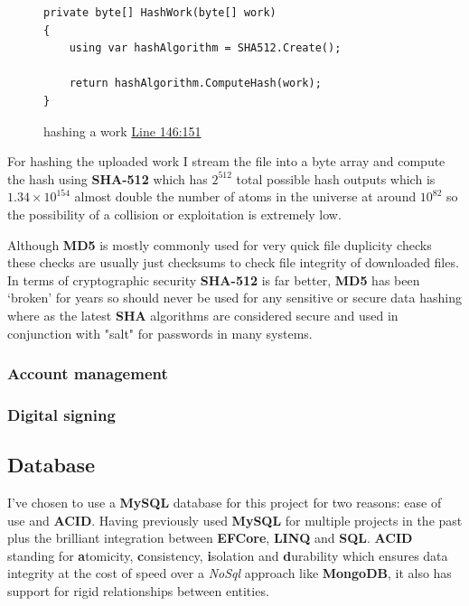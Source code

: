 \begin{figure}[H]
\caption{hashing a work \href{https://github.com/MrHarrisonBarker/CRPL/blob/main/CRPL.Web/Services/WorksVerificationService.cs}{Line 146:151}}
\centering
\begin{lstlisting}[language=CSharp]
private byte[] HashWork(byte[] work)
{
	using var hashAlgorithm = SHA512.Create();

	return hashAlgorithm.ComputeHash(work);
}
\end{lstlisting}
\end{figure}

For hashing the uploaded work I stream the file into a byte array and compute the hash using \textbf{SHA-512} which has \(2^{512}\) total possible hash outputs which is \(1.34 \times 10^{154}\) almost double the number of atoms in the universe at around \(10^{82}\) so the possibility of a collision or exploitation is extremely low. 

Although \textbf{MD5} is mostly commonly used for very quick file duplicity checks these checks are usually just checksums to check file integrity of downloaded files. In terms of cryptographic security \textbf{SHA-512} is far better, \textbf{MD5} has been `broken' for years so should never be used for any sensitive or secure data hashing where as the latest \textbf{SHA} algorithms are considered secure and used in conjunction with "salt" for passwords in many systems.

\subsubsection{Account management}
\subsubsection{Digital signing}

\subsection{Database}

I've chosen to use a \textbf{MySQL} database for this project for two reasons: ease of use and \textbf{ACID}. Having previously used \textbf{MySQL} for multiple projects in the past plus the brilliant integration between \textbf{EFCore}, \textbf{LINQ} and \textbf{SQL}. \textbf{ACID} standing for \textbf{a}tomicity, \textbf{c}onsistency, \textbf{i}solation and \textbf{d}urability which ensures data integrity at the cost of speed over a \textit{NoSql} approach like \textbf{MongoDB}, it also has support for rigid relationships between entities.

